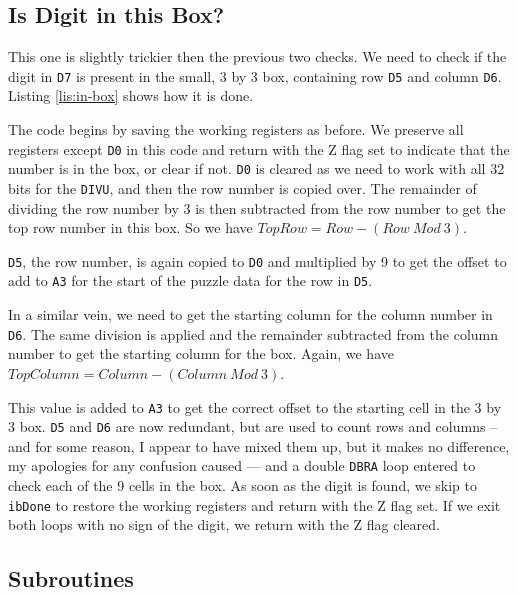 \subsection{Is Digit in this Box?}

This one is slightly trickier then the previous two checks. We need
to check if the digit in \texttt{D7} is present in the small, 3 by
3 box, containing row \texttt{D5} and column \texttt{D6}. Listing
\ref{lis:in-box} shows how it is done.

The code begins by saving the working registers as before. We preserve
all registers except \texttt{D0} in this code and return with the
Z flag set to indicate that the number is in the box, or clear if
not. \texttt{D0} is cleared as we need to work with all 32 bits for
the \texttt{DIVU}, and then the row number is copied over. The remainder
of dividing the row number by 3 is then subtracted from the row number
to get the top row number in this box. So we have $TopRow=Row-(Row\ Mod\ 3)$.

\texttt{D5}, the row number, is again copied to \texttt{D0} and multiplied
by 9 to get the offset to add to \texttt{A3} for the start of the
puzzle data for the row in \texttt{D5}.



In a similar vein, we need to get the starting column for the column
number in \texttt{D6}. The same division is applied and the remainder
subtracted from the column number to get the starting column for the
box. Again, we have $TopColumn=Column-(Column\ Mod\ 3)$.

This value is added to \texttt{A3} to get the correct offset to the
starting cell in the 3 by 3 box. \texttt{D5} and \texttt{D6} are now
redundant, but are used to count rows and columns -- and for some
reason, I appear to have mixed them up, but it makes no difference,
my apologies for any confusion caused --- and a double \texttt{DBRA}
loop entered to check each of the 9 cells in the box. As soon as the
digit is found, we skip to \texttt{ibDone} to restore the working
registers and return with the Z flag set. If we exit both loops with
no sign of the digit, we return with the Z flag cleared.

\subsection{Subroutines}

